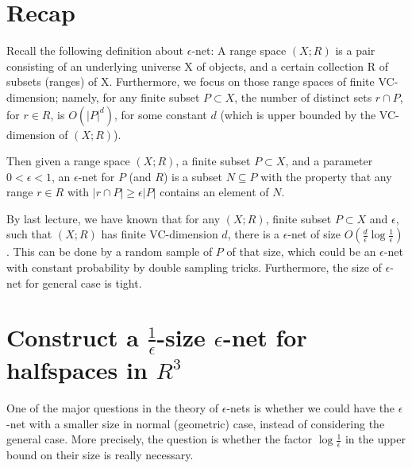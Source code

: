 \documentclass[11pt]{article}
\begin{document}
\setlength{\fboxrule}{.5mm}\setlength{\fboxsep}{1.2mm}
\newlength{\boxlength}\setlength{\boxlength}{\textwidth}
\addtolength{\boxlength}{-4mm}
\begin{center}\end{center}
\vspace{5mm}

\section{Recap}
Recall the following definition about $\epsilon$-net:
A range space $(X;R)$ is a pair consisting of an underlying universe X of objects, and a certain collection
	R of subsets (ranges) of X. 
Furthermore, we focus on those range spaces of finite  VC-dimension; namely, for any finite subset $P\subset X$, the number of distinct sets $r\cap P$,
for $r\in R$, is $O(|P|^d)$, for some constant $d$ (which is upper bounded by the VC-dimension of $(X;R)$).

Then given a range space $(X;R)$, a finite subset $P \subset X$, and a parameter $0 < \epsilon < 1$, an $\epsilon$-net for $P$ (and
$R$) is a subset $N \subseteq P$ with the property that any range $r \in R$ with $|r\cap P|\geq \epsilon|P|$ contains an element
of $N$. 

By last lecture, we have known that for any $(X;R)$, finite subset $P\subset X$ and $\epsilon$, such
	that $(X;R)$ has finite  VC-dimension $d$,
	there is a $\epsilon$-net of size $O(\frac{d}{\epsilon}\log \frac{1}{\epsilon})$. 
This can be done by a random
	sample of $P$ of that size, which could be an $\epsilon$-net with constant probability by
	double sampling tricks. 
Furthermore, the size of $\epsilon$-net for general case is tight.

\section{Construct a $\frac{1}{\epsilon}$-size $\epsilon$-net for halfspaces in $R^3$}\label{first}


One of the major questions in the theory of $\epsilon$-nets is whether we could have 
	the $\epsilon$-net with a smaller size in normal (geometric) case, instead of considering the general case.
More precisely, the question is whether the factor $\log \frac{1}{\epsilon}$
	 in the upper bound on their size is really necessary.
\end{document}
